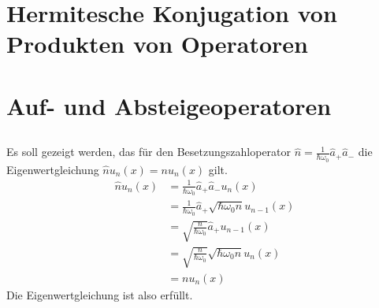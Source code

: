 \section{Hermitesche Konjugation von Produkten von Operatoren}

\section{Auf- und Absteigeoperatoren}

\subsection{}

\subsection{}

Es soll gezeigt werden, das für den Besetzungszahloperator $\hat n =
\frac1{\hbar\omega_0}\hat a_+\hat a_-$ die Eigenwertgleichung $\hat nu_n(x) =
nu_n(x)$ gilt.
\begin{align*}
    \hat n u_n(x) &= \frac1{\hbar\omega_0}\hat a_+\hat a_- u_n(x) \\
                  &= \frac1{\hbar\omega_0}\hat a_+ \sqrt{\hbar\omega_0n}u_{n-1}(x) \\
                  &= \sqrt{\frac{n}{\hbar\omega_0}} \hat a_+ u_{n-1}(x) \\
                  &= \sqrt{\frac{n}{\hbar\omega_0}} \sqrt{\hbar\omega_0n}u_n(x) \\
                  &= nu_n(x)
\end{align*}
Die Eigenwertgleichung ist also erfüllt.


